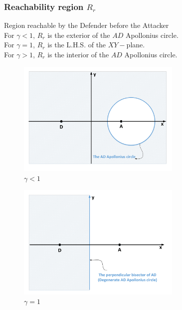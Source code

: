 \documentclass{beamer}
\begin{document}
\begin{frame}
\frametitle{Reachability region $R_r$}
Region reachable by the Defender before the Attacker\\
For $\gamma<1$, $R_r$ is the exterior of the $AD$ Apollonius circle.\\
For $\gamma=1$, $R_r$ is the L.H.S. of the $XY-$plane.\\
For $\gamma>1$, $R_r$ is the interior of the $AD$ Apollonius circle.
\end{frame}
\begin{frame}
\centering
\begin{figure}
\includegraphics[width=0.7\textwidth]{fig/drawing4_1a.pdf}
\caption {$\gamma<1$}
\end{figure}
\end{frame}
\begin{frame}
\begin{figure}
\includegraphics[width=0.7\textwidth]{fig/drawing4_1b.pdf}
\caption {$\gamma=1$}
\end{figure}
\end{frame}
\end{document}
